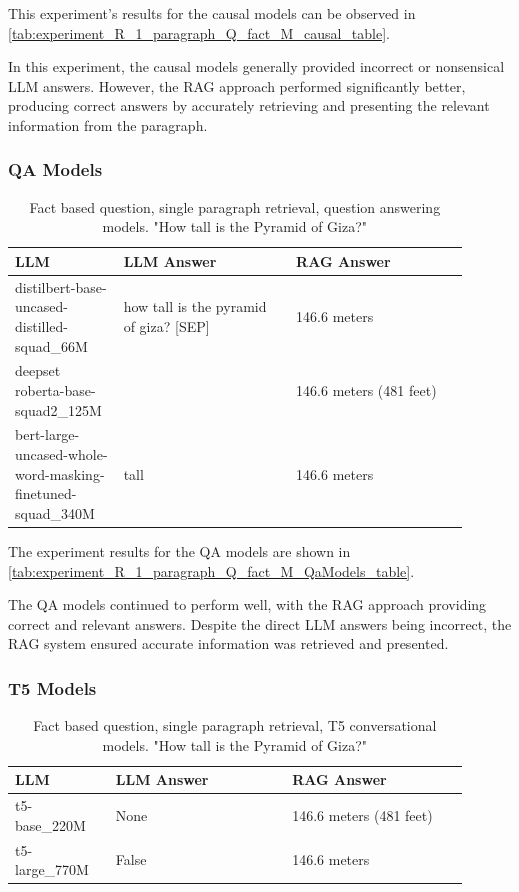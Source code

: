 \documentclass{wseas}
\begin{document}
This experiment's results for the causal models can be observed in 
\autoref{tab:experiment_R_1_paragraph_Q_fact_M_causal_table}.

In this experiment, the causal models generally provided incorrect or nonsensical LLM answers. 
However, the RAG approach performed significantly better, producing correct answers by accurately 
retrieving and presenting the relevant information from the paragraph.


\subsubsection{QA Models}
\begin{table}[htbp]
  \centering
  \caption{Fact based question, single paragraph retrieval, question answering models. "How tall is the Pyramid of Giza?"} %
  \label{tab:experiment_R_1_paragraph_Q_fact_M_QaModels_table}
  \begin{tabular}{|p{0.2\linewidth}|p{0.35\linewidth}|p{0.35\linewidth}|}
    \hline
    \textbf{LLM} & \textbf{LLM Answer} & \textbf{RAG Answer} \\ \hline
    distilbert-base-uncased-distilled-squad\_66M & how tall is the pyramid of giza? {[}SEP{]} & 146.6 meters \\ \hline
    deepset roberta-base-squad2\_125M &  & 146.6 meters (481 feet) \\ \hline
    bert-large-uncased-whole-word-masking-finetuned-squad\_340M & tall & 146.6 meters \\ \hline
  \end{tabular}
\end{table}

The experiment results for the QA models are shown in \autoref{tab:experiment_R_1_paragraph_Q_fact_M_QaModels_table}.

The QA models continued to perform well, with the RAG approach providing correct and relevant answers.
Despite the direct LLM answers being incorrect, the RAG system ensured accurate information
was retrieved and presented.

\subsubsection{T5 Models}


\begin{table}[htbp]
  \centering
  \caption{Fact based question, single paragraph retrieval, T5 conversational models. "How tall is the Pyramid of Giza?"} %
  \label{tab:experiment_R_1_paragraph_Q_fact_M_T5Models_table}
  \begin{tabular}{|p{0.20\linewidth}|p{0.35\linewidth}|p{0.35\linewidth}|}
    \hline
    \textbf{LLM} & \textbf{LLM Answer} & \textbf{RAG Answer} \\ \hline
    t5-base\_220M & None & 146.6 meters (481 feet) \\ \hline
    t5-large\_770M & False & 146.6 meters \\ \hline
  \end{tabular}
\end{table}
\end{document}
